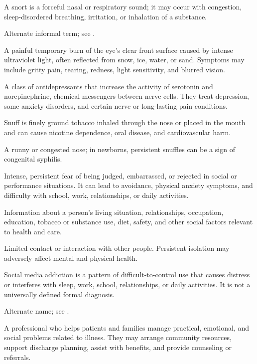  A snort is a forceful nasal or respiratory sound; it may occur with congestion, sleep-disordered breathing, irritation, or inhalation of a substance.

 Alternate informal term; see .

 A painful temporary burn of the eye’s clear front surface caused by intense ultraviolet light, often reflected from snow, ice, water, or sand. Symptoms may include gritty pain, tearing, redness, light sensitivity, and blurred vision.

 A class of antidepressants that increase the activity of serotonin and norepinephrine, chemical messengers between nerve cells. They treat depression, some anxiety disorders, and certain nerve or long-lasting pain conditions.

 Snuff is finely ground tobacco inhaled through the nose or placed in the mouth and can cause nicotine dependence, oral disease, and cardiovascular harm.

 A runny or congested nose; in newborns, persistent snuffles can be a sign of congenital syphilis.

 Intense, persistent fear of being judged, embarrassed, or rejected in social or performance situations. It can lead to avoidance, physical anxiety symptoms, and difficulty with school, work, relationships, or daily activities.

 Information about a person's living situation, relationships, occupation, education, tobacco or substance use, diet, safety, and other social factors relevant to health and care.

 Limited contact or interaction with other people. Persistent isolation may adversely affect mental and
physical health.

 Social media addiction is a pattern of difficult-to-control use that causes distress or interferes with sleep, work, school, relationships, or daily activities. It is not a universally defined formal diagnosis.

 Alternate name; see .

 A professional who helps patients and families manage practical, emotional, and social problems related to illness. They may arrange community resources, support discharge planning, assist with benefits, and provide counseling or referrals.

